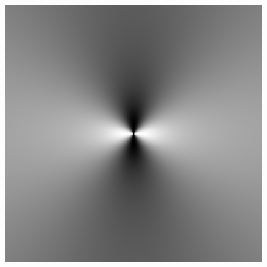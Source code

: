 \begin{figure}
{ \includegraphics[scale=0.25]{figures/unified_dfilt_wr_sqrt8.png}
 }
 \hfill
\end{figure}
